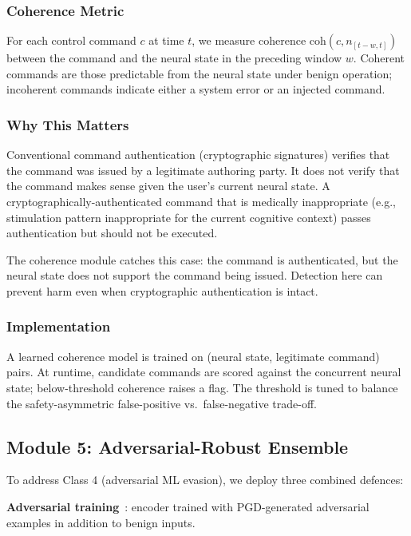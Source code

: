\documentclass[sigconf,nonacm]{acmart}
\begin{document}
\subsubsection{Coherence Metric}

For each control command $c$ at time $t$, we measure coherence
$\text{coh}(c, n_{[t-w,t]})$ between the command and the neural
state in the preceding window $w$. Coherent commands are those
predictable from the neural state under benign operation;
incoherent commands indicate either a system error or an injected
command.

\subsubsection{Why This Matters}

Conventional command authentication (cryptographic signatures)
verifies that the command was issued by a legitimate authoring
party. It does not verify that the command makes sense given the
user's current neural state. A cryptographically-authenticated
command that is medically inappropriate (e.g., stimulation pattern
inappropriate for the current cognitive context) passes
authentication but should not be executed.

The coherence module catches this case: the command is
authenticated, but the neural state does not support the command
being issued. Detection here can prevent harm even when
cryptographic authentication is intact.

\subsubsection{Implementation}

A learned coherence model is trained on (neural state, legitimate
command) pairs. At runtime, candidate commands are scored against
the concurrent neural state; below-threshold coherence raises a
flag. The threshold is tuned to balance the safety-asymmetric
false-positive vs.\ false-negative trade-off.

\subsection{Module 5: Adversarial-Robust Ensemble}

To address Class 4 (adversarial ML evasion), we deploy three
combined defences:

\textbf{Adversarial training}~\cite{madry2018towards}: encoder
trained with PGD-generated adversarial examples in addition to
benign inputs.
\end{document}
